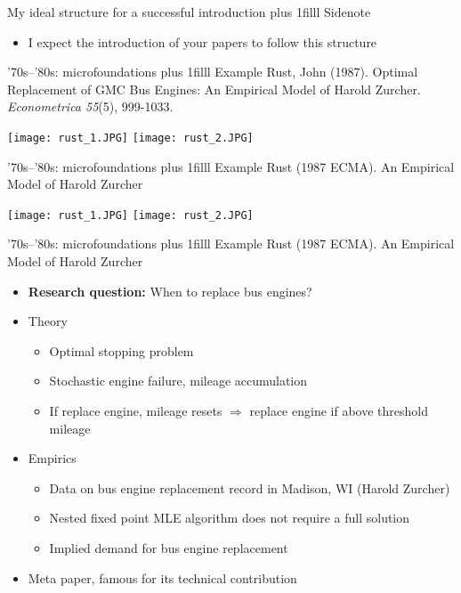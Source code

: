\documentclass[aspectratio=169,compress,t,xcolor=table]{beamer}
\newcommand{\myhfill}[1]{\hskip0pt plus 1filll {\small #1}}
\begin{document}
{\begin{frame}{My ideal structure for a successful introduction \myhfill{Sidenote}}
\begin{itemize}
    \vfill\item I expect the introduction of your papers to follow this structure
  \end{itemize}
\end{frame}
}

\begin{frame}{'70s--'80s: microfoundations \myhfill{Example}}
Rust, John (1987). Optimal Replacement of GMC Bus Engines: An Empirical Model of Harold Zurcher. \textit{Econometrica 55}(5), 999-1033.
  \begin{center}
    \texttt{[image: rust\_1.JPG]} \hspace*{1em}
    \texttt{[image: rust\_2.JPG]}
  \end{center}
\end{frame}
\addtocounter{framenumber}{-1}

\begin{frame}{'70s--'80s: microfoundations \myhfill{Example}}
Rust (1987 ECMA). An Empirical Model of Harold Zurcher \\ \phantom{99,}
  \begin{center}
    \texttt{[image: rust\_1.JPG]} \hspace*{1em}
    \texttt{[image: rust\_2.JPG]}
  \end{center}
\end{frame}
\addtocounter{framenumber}{-1}

\begin{frame}{'70s--'80s: microfoundations \myhfill{Example}}
Rust (1987 ECMA). An Empirical Model of Harold Zurcher
  \begin{itemize}
    \vfill\item {\color{MyStructure}\textbf{Research question:}} When to replace bus engines?
    \vfill\item Theory
    \begin{itemize}
      \item Optimal stopping problem
      \item Stochastic engine failure, mileage accumulation
      \item If replace engine, mileage resets \(\Rightarrow\) replace engine if above threshold mileage
    \end{itemize}
    \vfill\item Empirics
    \begin{itemize}
      \item Data on bus engine replacement record in Madison, WI (Harold Zurcher)
      \item Nested fixed point MLE algorithm does not require a full solution
      \item Implied demand for bus engine replacement
    \end{itemize}

    \vfill\item Meta paper, famous for its technical contribution
  \end{itemize}
\end{frame}
\end{document}
